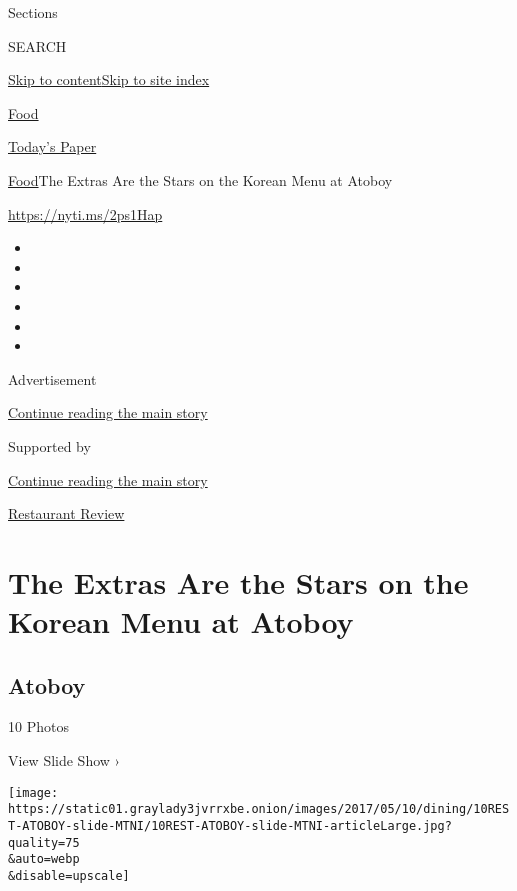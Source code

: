 Sections

SEARCH

\protect\hyperlink{site-content}{Skip to
content}\protect\hyperlink{site-index}{Skip to site index}

\href{https://www.nytimes3xbfgragh.onion/section/food}{Food}

\href{https://myaccount.nytimes3xbfgragh.onion/auth/login?response_type=cookie\&client_id=vi}{}

\href{https://www.nytimes3xbfgragh.onion/section/todayspaper}{Today's
Paper}

\href{/section/food}{Food}\textbar{}The Extras Are the Stars on the
Korean Menu at Atoboy

\url{https://nyti.ms/2ps1Hap}

\begin{itemize}
\item
\item
\item
\item
\item
\item
\end{itemize}

Advertisement

\protect\hyperlink{after-top}{Continue reading the main story}

Supported by

\protect\hyperlink{after-sponsor}{Continue reading the main story}

\href{/column/restaurant-review}{Restaurant Review}

\hypertarget{the-extras-are-the-stars-on-the-korean-menu-at-atoboy}{%
\section{The Extras Are the Stars on the Korean Menu at
Atoboy}\label{the-extras-are-the-stars-on-the-korean-menu-at-atoboy}}

\href{https://www.nytimes3xbfgragh.onion/slideshow/2017/05/09/dining/atoboy-nyc-review.html}{}

\hypertarget{atoboy}{%
\subsection{Atoboy}\label{atoboy}}

10 Photos

View Slide Show ›

\texttt{[image: https://static01.graylady3jvrrxbe.onion/images/2017/05/10/dining/10REST-ATOBOY-slide-MTNI/10REST-ATOBOY-slide-MTNI-articleLarge.jpg?quality=75\\\&auto=webp\\\&disable=upscale]}

